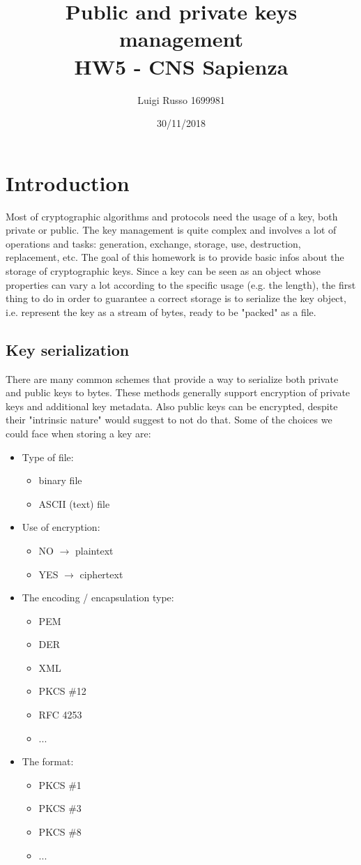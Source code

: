 \documentclass[11 pt]{article}
\title{
	Public and private keys management \\
	\large HW5 - CNS Sapienza}
\author{Luigi Russo 1699981}
\date{30/11/2018}
\begin{document}
\maketitle

\section{Introduction}
Most of cryptographic algorithms and protocols need the usage of a key, both private or public. The key management is quite complex and involves \cite{Wikipedia} a lot of operations and tasks: generation, exchange, storage, use, destruction, replacement, etc. The goal of this homework is to provide basic infos about the storage of cryptographic keys. Since a key can be seen as an object whose properties can vary a lot according to the specific usage (e.g. the length), the first thing to do in order to guarantee a correct storage is to serialize the key object, i.e. represent the key as a stream of bytes, ready to be "packed" as a file.
\subsection{Key serialization}
There are many common schemes that provide a way to serialize both private and public keys to bytes. These methods generally support encryption of private keys and additional key metadata. Also public keys can be encrypted, despite their "intrinsic nature" would suggest to not do that. Some of the choices we could face when storing a key are:
\begin{itemize}
	\item Type of file:
	\begin{itemize}
		\item binary file
		\item ASCII (text) file
	\end{itemize}
	\item Use of encryption:
	\begin{itemize}
		\item NO $\rightarrow$ plaintext
		\item YES $\rightarrow$ ciphertext
	\end{itemize}
	\item The encoding / encapsulation type:
	\begin{itemize}
		\item PEM
		\item DER
		\item XML
		\item PKCS \#12
		\item RFC 4253
		\item ...
	\end{itemize}
	\item The format:
	\begin{itemize}
		\item PKCS \#1
		\item PKCS \#3
		\item PKCS \#8
		\item ...
	\end{itemize}
\end{itemize}
\end{document}
